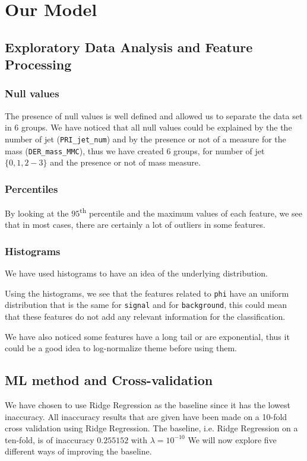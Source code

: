 \documentclass[10pt,conference,compsocconf]{IEEEtran}
\begin{document}
\section{Our Model}
\subsection{Exploratory Data Analysis and Feature Processing}
\subsubsection{Null values}
The presence of null values is well defined and allowed us to separate the
data set in 6 groups. We have noticed that all null values could be
explained by the the number of jet (\texttt{PRI\_jet\_num}) and by the presence or not of a
measure for the mass (\texttt{DER\_mass\_MMC}), thus we have created 6 groups, for number of jet
$\lbrace 0, 1, 2-3 \rbrace$ and the presence or not of mass measure. %

\subsubsection{Percentiles}

By looking at the $95$\textsuperscript{th} percentile and the maximum values of each feature, we see
that in most cases, there are certainly a lot of outliers in some features.

\subsubsection{Histograms}

We have used histograms to have an idea of the underlying distribution.

Using the histograms, we see that the features related to \texttt{phi} have an uniform
distribution that is the same for \texttt{signal} and for \texttt{background}, this could mean
that these features do not add any relevant information for the classification.

We have also noticed some features have a long tail or are exponential, thus it could be a good
idea to log-normalize theme before using them.

\subsection{ML method and Cross-validation}
We have chosen to use Ridge Regression as the baseline since it has the lowest
inaccuracy.
All inaccuracy results that are given have been made on a 10-fold cross validation
using Ridge Regression. The baseline, i.e. Ridge Regression on a ten-fold, is
of inaccuracy $0.255152$ with $\lambda = 10^{-10}$
We will now explore five different ways of improving the baseline.
\end{document}
